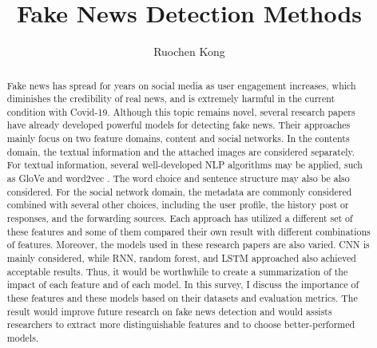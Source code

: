 \documentclass[sigconf ,nonacm]{acmart}
\begin{document}
\title{Fake News Detection Methods}

\author{Ruochen Kong}

\begin{abstract}
Fake news has spread for years on social media as user engagement increases, which diminishes the credibility of real news, and is extremely harmful in the current condition with Covid-19. Although this topic remains novel, several research papers have already developed powerful models for detecting fake news. Their approaches mainly focus on two feature domains, content and social networks. In the contents domain, the textual information and the attached images are considered separately. For textual information, several well-developed NLP algorithms may be applied, such as GloVe \cite{glove} and word2vec \cite{w2v}. The word choice and sentence structure may also be also considered. For the social network domain, the metadata are commonly considered combined with several other choices, including the user profile, the history post or responses, and the forwarding sources. Each approach has utilized a different set of these features and some of them compared their own result with different combinations of features. Moreover, the models used in these research papers are also varied. CNN is mainly considered, while RNN, random forest, and LSTM approached also achieved acceptable results. Thus, it would be worthwhile to create a summarization of the impact of each feature and of each model. In this survey, I discuss the importance of these features and these models based on their datasets and evaluation metrics. The result would improve future research on fake news detection and would assists researchers to extract more distinguishable features and to choose better-performed models. 
\end{abstract}

\maketitle
\end{document}
